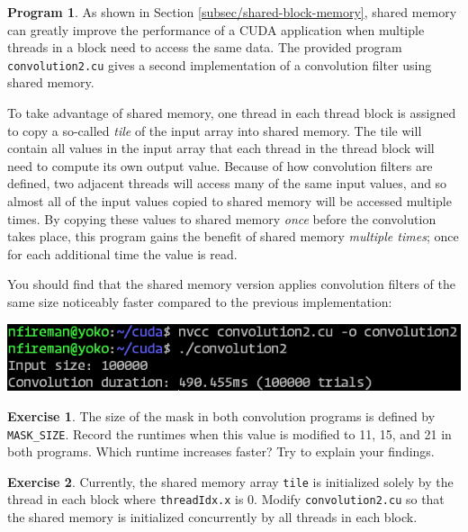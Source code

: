 \documentclass{article}
\theoremstyle{definition}
\newtheorem{program}{Program}
\newtheorem{exercise}{Exercise}
\begin{document}
\begin{program}
As shown in Section \ref{subsec/shared-block-memory}, shared memory can greatly improve the performance of a CUDA application when multiple threads in a block need to access the same data. The provided program \texttt{convolution2.cu} gives a second implementation of a convolution filter using shared memory. 

To take advantage of shared memory, one thread in each thread block is assigned to copy a so-called \emph{tile} of the input array into shared memory. The tile will contain all values in the input array that each thread in the thread block will need to compute its own output value. Because of how convolution filters are defined, two adjacent threads will access many of the same input values, and so almost all of the input values copied to shared memory will be accessed multiple times. By copying these values to shared memory \emph{once} before the convolution takes place, this program gains the benefit of shared memory \emph{multiple times}; once for each additional time the value is read.

You should find that the shared memory version applies convolution filters of the same size noticeably faster compared to the previous implementation:

\includegraphics[width=\textwidth]{images/convolution2-output.png}
\end{program}

\begin{exercise}
The size of the mask in both convolution programs is defined by \texttt{MASK\_SIZE}. Record the runtimes when this value is modified to 11, 15, and 21 in both programs. Which runtime increases faster? Try to explain your findings.
\end{exercise}

\begin{exercise}
Currently, the shared memory array \texttt{tile} is initialized solely by the thread in each block where \texttt{threadIdx.x} is 0. Modify \texttt{convolution2.cu} so that the shared memory is initialized concurrently by all threads in each block.
\end{exercise}
\end{document}
